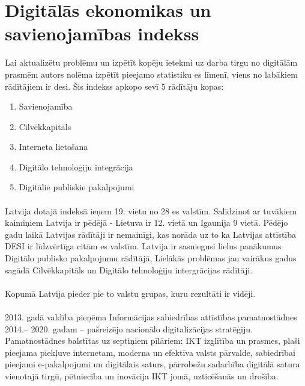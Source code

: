 \section{Digitālās ekonomikas un savienojamības indekss}
Lai aktualizētu problēmu un izpētīt kopēju ietekmi uz darba tirgu no digitālām prasmēm 
autors nolēma izpētīt pieejamo statistiku \gls{es} līmenī, viens no labākiem
rādītājiem ir \gls{desi}. Šis indekss apkopo sevī 5 rādītāju kopas:
\begin{enumerate}
    \item Savienojamība
    \item Cilvēkkapitāls
    \item Interneta lietošana
    \item Digitālo tehnoloģiju integrācija
    \item Digitālie publiskie pakalpojumi
\end{enumerate}

\paragraph{}
Latvija dotajā indeksā ieņem 19. vietu no 28 \acrshort{es} valstīm. Salīdzinot
ar tuvākiem kaimiņiem Latvija ir pēdējā - Lietuva ir 12. vietā un Igaunija 9 vietā. Pēdējo
gadu laikā Latvijas rādītāji ir nemainīgi, kas norāda uz to ka Latvijas attīstība DESI
ir līdzvērtīga citām \acrshort{es} valstīm. Latvija ir sasniegusi lielus panākumus 
Digitālo publisko pakalpojumu rādītājā, Lielākās problēmas jau vairākus gadus sagādā
Cilvēkkapitāls un Digitālo tehnoloģiju intergrācijas rādītāji.
\paragraph{}
Kopumā Latvija pieder pie to valstu grupas, kuru rezultāti ir vidēji.
\paragraph{}
2013. gadā valdība pieņēma Informācijas sabiedrības attīstības pamatnostādnes 2014.–
2020. gadam – pašreizējo nacionālo digitalizācijas stratēģiju. Pamatnostādnes balstītas uz
septiņiem pīlāriem: IKT izglītība un prasmes, plaši pieejama piekļuve internetam, moderna
un efektīva valsts pārvalde, sabiedrībai pieejami e-pakalpojumi un digitālais saturs,
pārrobežu sadarbība digitālā satura vienotajā tirgū, pētniecība un inovācija IKT jomā,
uzticēšanās un drošība\cite{desi_Latvija, soc_dev}.
